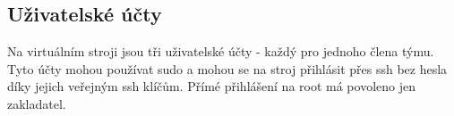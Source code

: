 \subsection{Uživatelské účty}
Na virtuálním stroji jsou tři uživatelské účty - každý pro jednoho člena týmu. Tyto účty mohou používat sudo a mohou se na stroj přihlásit přes ssh bez hesla díky jejich veřejným ssh klíčům.
Přímé přihlášení na root má povoleno jen zakladatel.